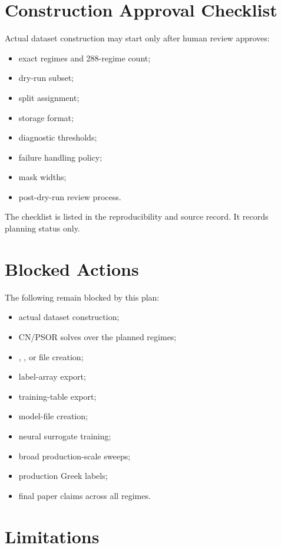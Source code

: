 \documentclass[11pt,a4paper]{article}
\newcommand{\code}[1]{\path{#1}}
\begin{document}
\section{Construction Approval Checklist}

Actual dataset construction may start only after human review approves:
\begin{itemize}
  \item exact regimes and 288-regime count;
  \item dry-run subset;
  \item split assignment;
  \item storage format;
  \item diagnostic thresholds;
  \item failure handling policy;
  \item mask widths;
  \item post-dry-run review process.
\end{itemize}

The checklist is listed in the reproducibility and source record. It records planning status only.

\section{Blocked Actions}

The following remain blocked by this plan:
\begin{itemize}
  \item actual dataset construction;
  \item CN/PSOR solves over the planned regimes;
  \item \code{.npz}, \code{.npy}, or \code{.pt} file creation;
  \item label-array export;
  \item training-table export;
  \item model-file creation;
  \item neural surrogate training;
  \item broad production-scale sweeps;
  \item production Greek labels;
  \item final paper claims across all regimes.
\end{itemize}

\section{Limitations}
\end{document}
